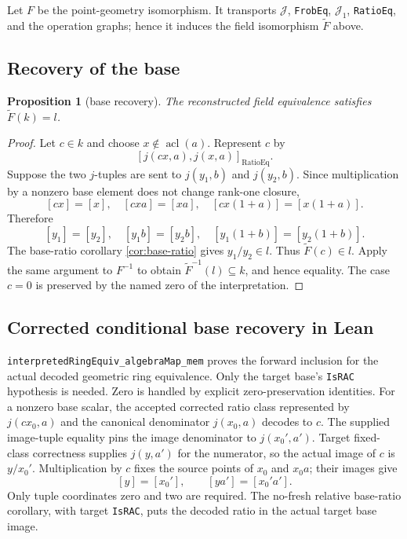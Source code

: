 \documentclass[11pt,oneside]{article}
\newtheorem{proposition}[theorem]{Proposition}
\theoremstyle{definition}
\theoremstyle{remark}
\newcommand{\acl}{\operatorname{acl}}
\newcommand{\Jrel}{\mathcal{J}}
\newcommand{\lean}[1]{\nolinkurl{#1}}
\begin{document}
Let $F$ be the point-geometry isomorphism.  It transports $\Jrel$, \lean{FrobEq},
$\Jrel_1$, \lean{RatioEq}, and the operation graphs; hence it induces the field isomorphism
$\widetilde F$ above.

\subsection{Recovery of the base}

\begin{proposition}[base recovery]\label{prop:base-recovery}
The reconstructed field equivalence satisfies $\widetilde F(k)=l$.
\end{proposition}
\begin{proof}
Let $c\in k$ and choose $x\notin\acl(a)$.  Represent $c$ by
\[
  [j(cx,a),j(x,a)]_{\operatorname{RatioEq}}.
\]
Suppose the two $j$-tuples are sent to $j(y_1,b)$ and $j(y_2,b)$.  Since multiplication
by a nonzero base element does not change rank-one closure,
\[
 [cx]=[x],\quad[cxa]=[xa],\quad[cx(1+a)]=[x(1+a)].
\]
Therefore
\[
 [y_1]=[y_2],\quad[y_1b]=[y_2b],\quad[y_1(1+b)]=[y_2(1+b)].
\]
The base-ratio corollary \cref{cor:base-ratio} gives $y_1/y_2\in l$.  Thus
$\widetilde F(c)\in l$.  Apply the same argument to $F^{-1}$ to obtain
$\widetilde F^{-1}(l)\subseteq k$, and hence equality.  The case $c=0$ is preserved by
the named zero of the interpretation.
\end{proof}

\subsection{Corrected conditional base recovery in Lean}

\lean{interpretedRingEquiv_algebraMap_mem} proves the forward inclusion for the actual
decoded geometric ring equivalence. Only the target base's \lean{IsRAC} hypothesis
is needed. Zero is handled by explicit zero-preservation identities. For a nonzero
base scalar, the accepted corrected ratio class represented by
$j(cx_0,a)$ and the canonical denominator $j(x_0,a)$ decodes to $c$.
The supplied image-tuple equality pins the image denominator to $j(x_0',a')$.
Target fixed-class correctness supplies $j(y,a')$ for the numerator, so the
actual image of $c$ is $y/x_0'$. Multiplication by $c$ fixes the source points
of $x_0$ and $x_0a$; their images give
\[
 [y]=[x_0'],\qquad [ya']=[x_0'a'].
\]
Only tuple coordinates zero and two are required. The no-fresh relative
base-ratio corollary, with target \lean{IsRAC}, puts the decoded ratio in the
actual target base image.
\end{document}
